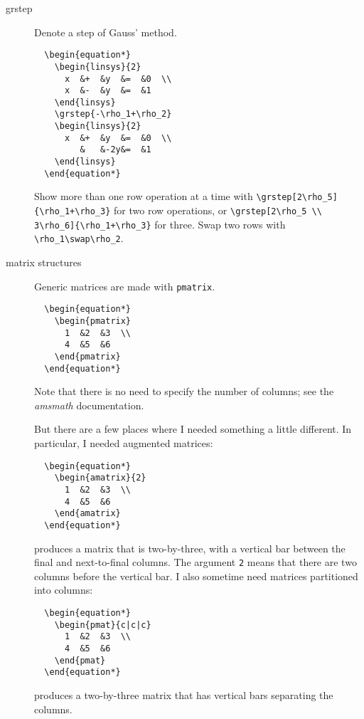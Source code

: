 \documentclass[titlepage]{article}
\begin{document}
\begin{description}
\item[grstep]
  Denote a step of Gauss' method.
\begin{verbatim}
  \begin{equation*}
    \begin{linsys}{2}
      x  &+  &y  &=  &0  \\
      x  &-  &y  &=  &1
    \end{linsys}
    \grstep{-\rho_1+\rho_2}
    \begin{linsys}{2}
      x  &+  &y  &=  &0  \\
         &   &-2y&=  &1
    \end{linsys}
  \end{equation*}
\end{verbatim}
  Show more than one row operation at a time with
  \verb|\grstep[2\rho_5]{\rho_1+\rho_3}| for two row operations,
  or \verb|\grstep[2\rho_5 \\ 3\rho_6]{\rho_1+\rho_3}| for three.
  Swap two rows with \verb|\rho_1\swap\rho_2|.
  
\item[matrix structures]
Generic matrices are made with \verb|pmatrix|. 
\begin{verbatim}
  \begin{equation*}
    \begin{pmatrix}
      1  &2  &3  \\
      4  &5  &6 
    \end{pmatrix}
  \end{equation*}
\end{verbatim}
  Note that there is no need to specify the number of columns;
  see the \textit{amsmath} documentation.

  But there are a few places where I needed something a little different.
  In particular, I needed augmented matrices:
\begin{verbatim}
  \begin{equation*}
    \begin{amatrix}{2}
      1  &2  &3  \\
      4  &5  &6 
    \end{amatrix}
  \end{equation*}
\end{verbatim}
  produces a matrix that is two-by-three, with a vertical bar between
  the final and next-to-final columns. 
  The argument \texttt{2} means that there
  are two columns before the vertical bar.
  I also sometime need matrices partitioned into columns:
\begin{verbatim}
  \begin{equation*}
    \begin{pmat}{c|c|c}
      1  &2  &3  \\
      4  &5  &6 
    \end{pmat}
  \end{equation*}
\end{verbatim}
  produces a two-by-three matrix that has vertical bars separating the
  columns.


\end{description}
\end{document}
